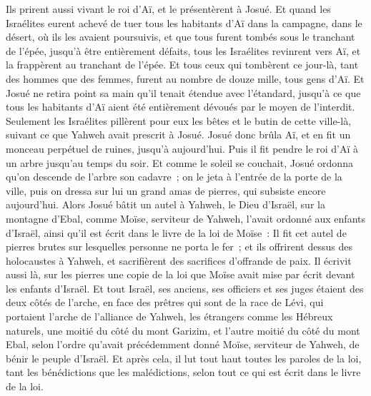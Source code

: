 \begin{multicols}{2}
Ils prirent aussi vivant le roi d'Aï, et le présentèrent à Josué.
Et quand les Israélites eurent achevé de tuer tous les habitants d'Aï dans la campagne, dans le désert, où ils les avaient poursuivis, et que tous furent tombés sous le tranchant de l'épée, jusqu'à être entièrement défaits, tous les Israélites revinrent vers Aï, et la frappèrent au tranchant de l'épée.
Et tous ceux qui tombèrent ce jour-là, tant des hommes que des femmes, furent au nombre de douze mille, tous gens d'Aï.
Et Josué ne retira point sa main qu'il tenait étendue avec l'étandard, jusqu'à ce que tous les habitants d'Aï aient été entièrement dévoués par le moyen de l'interdit.
Seulement les Israélites pillèrent pour eux les bêtes et le butin de cette ville-là, suivant ce que Yahweh avait prescrit à Josué.
Josué donc brûla Aï, et en fit un monceau perpétuel de ruines, jusqu'à aujourd'hui.
Puis il fit pendre le roi d'Aï à un arbre jusqu'au temps du soir. Et comme le soleil se couchait, Josué ordonna qu'on descende de l'arbre son cadavre~; on le jeta à l'entrée de la porte de la ville, puis on dressa sur lui un grand amas de pierres, qui subsiste encore aujourd'hui.
Alors Josué bâtit un autel à Yahweh, le Dieu d'Israël, sur la montagne d'Ebal,
comme Moïse, serviteur de Yahweh, l'avait ordonné aux enfants d'Israël, ainsi qu'il est écrit dans le livre de la loi de Moïse~: Il fit cet autel de pierres brutes sur lesquelles personne ne porta le fer~; et ils offrirent dessus des holocaustes à Yahweh, et sacrifièrent des sacrifices d'offrande de paix.
Il écrivit aussi là, sur les pierres une copie de la loi que Moïse avait mise par écrit devant les enfants d'Israël.
Et tout Israël, ses anciens, ses officiers et ses juges étaient des deux côtés de l'arche, en face des prêtres qui sont de la race de Lévi, qui portaient l'arche de l'alliance de Yahweh, les étrangers comme les Hébreux naturels, une moitié du côté du mont Garizim, et l'autre moitié du côté du mont Ebal, selon l'ordre qu'avait précédemment donné Moïse, serviteur de Yahweh, de bénir le peuple d'Israël.
Et après cela, il lut tout haut toutes les paroles de la loi, tant les bénédictions que les malédictions, selon tout ce qui est écrit dans le livre de la loi.

\end{multicols}
